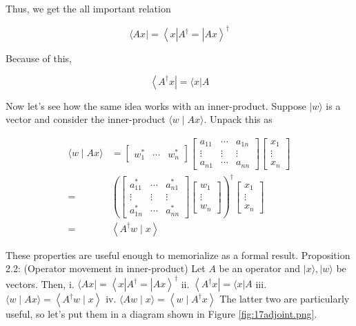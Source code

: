 \documentclass[main.tex]{subfiles}
\begin{document}
    Thus, we get the all important relation
    
    $$
    \langle A x|=\left\langle x\left|A^{\dagger}=\right| A x\right\rangle^{\dagger}
    $$
    
    Because of this,
    
    $$
    \left\langle A^{\dagger} x\right|=\langle x| A
    $$
    
    Now let's see how the same idea works with an inner-product. Suppose $|w\rangle$ is a vector and consider the inner-product $\langle w \mid A x\rangle$. Unpack this as
    
    $$
    \begin{aligned}
    \langle w \mid A x\rangle &=\left[\begin{array}{ccc}
    w_{1}^{*} & \cdots & w_{n}^{*}
    \end{array}\right]\left[\begin{array}{ccc}
    a_{11} & \cdots & a_{1 n} \\
    \vdots & \vdots & \vdots \\
    a_{n 1} & \cdots & a_{n n}
    \end{array}\right]\left[\begin{array}{r}
    x_{1} \\
    \vdots \\
    x_{n}
    \end{array}\right] \\
    =&\left(\left[\begin{array}{ccc}
    a_{11}^{*} & \cdots & a_{n 1}^{*} \\
    \vdots & \vdots & \vdots \\
    a_{1 n}^{*} & \cdots & a_{n n}^{*}
    \end{array}\right]\left[\begin{array}{r}
    w_{1} \\
    \vdots \\
    w_{n}
    \end{array}\right]\right)^{\dagger}\left[\begin{array}{r}
    x_{1} \\
    \vdots \\
    x_{n}
    \end{array}\right] \\
    =&\left\langle A^{\dagger} w \mid x\right\rangle
    \end{aligned}
    $$
    
    These properties are useful enough to memorialize as a formal result. Proposition 2.2: (Operator movement in inner-product) Let $A$ be an operator and $|x\rangle,|w\rangle$ be vectors. Then, i. $\langle A x|=\left\langle x\left|A^{\dagger}=\right| A x\right\rangle^{\dagger}$ ii. $\left\langle A^{\dagger} x\right|=\langle x| A$ iii. $\langle w \mid A x\rangle=\left\langle A^{\dagger} w \mid x\right\rangle$ iv. $\langle A w \mid x\rangle=\left\langle w \mid A^{\dagger} x\right\rangle$ The latter two are particularly useful, so let's put them in a diagram shown in Figure \ref{fig:17adjoint.png}.
    
\end{document}
